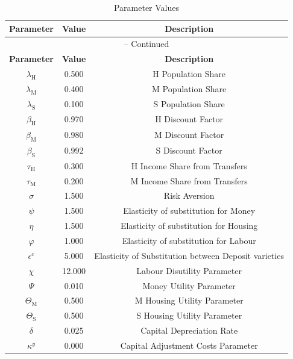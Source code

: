 \begin{center}
\begin{longtable}{ccc}
\caption{Parameter Values}\\%
\toprule%
\multicolumn{1}{c}{\textbf{Parameter}} &
\multicolumn{1}{c}{\textbf{Value}} &
 \multicolumn{1}{c}{\textbf{Description}}\\%
\midrule%
\endfirsthead
\multicolumn{3}{c}{{\tablename} \thetable{} -- Continued}\\%
\midrule%
\multicolumn{1}{c}{\textbf{Parameter}} &
\multicolumn{1}{c}{\textbf{Value}} &
  \multicolumn{1}{c}{\textbf{Description}}\\%
\midrule%
\endhead
$\lambda_\mathrm{H}$ 	 & 	 0.500 	 & 	 H Population Share\\
$\lambda_\mathrm{M}$ 	 & 	 0.400 	 & 	 M Population Share\\
$\lambda_\mathrm{S}$ 	 & 	 0.100 	 & 	 S Population Share\\
$\beta_\mathrm{H}$ 	 & 	 0.970 	 & 	 H Discount Factor\\
$\beta_\mathrm{M}$ 	 & 	 0.980 	 & 	 M Discount Factor\\
$\beta_\mathrm{S}$ 	 & 	 0.992 	 & 	 S Discount Factor\\
$\tau_\mathrm{H}$ 	 & 	 0.300 	 & 	 H Income Share from Transfers\\
$\tau_\mathrm{M}$ 	 & 	 0.200 	 & 	 M Income Share from Transfers\\
$\sigma$ 	 & 	 1.500 	 & 	 Risk Aversion\\
$\psi$ 	 & 	 1.500 	 & 	 Elasticity of substitution for Money\\
$\eta$ 	 & 	 1.500 	 & 	 Elasticity of substitution for Housing\\
$\varphi$ 	 & 	 1.000 	 & 	 Elasticity of substitution for Labour\\
$\epsilon^c$ 	 & 	 5.000 	 & 	 Elasticity of Substitution between Deposit varieties\\
$\chi$ 	 & 	 12.000 	 & 	 Labour Disutility Parameter\\
$\Psi$ 	 & 	 0.010 	 & 	 Money Utility Parameter\\
$\Theta_\mathrm{M}$ 	 & 	 0.500 	 & 	 M Housing Utility Parameter\\
$\Theta_\mathrm{S}$ 	 & 	 0.500 	 & 	 S Housing Utility Parameter\\
$\delta$ 	 & 	 0.025 	 & 	 Capital Depreciation Rate\\
$\kappa^y$ 	 & 	 0.000 	 & 	 Capital Adjustment Costs Parameter\\

\end{longtable}
\end{center}
